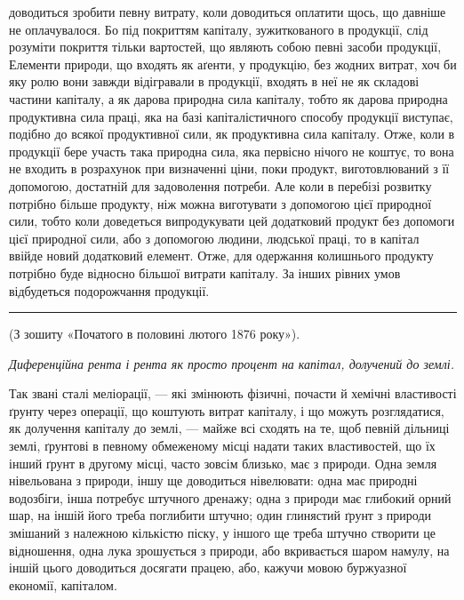 \parcont{}  %
доводиться зробити певну витрату, коли доводиться оплатити щось, що давніше
не оплачувалося. Бо під покриттям капіталу, зужиткованого в продукції, слід
розуміти покриття тільки вартостей, що являють собою певні засоби продукції,
Елементи природи, що входять як аґенти, у продукцію, без жодних витрат,
хоч би яку ролю вони завжди відігравали в продукції, входять в неї не як складові
частини капіталу, а як дарова природна сила капіталу, тобто як дарова природна
продуктивна сила праці, яка на базі капіталістичного способу продукції
виступає, подібно до всякої продуктивної сили, як продуктивна сила капіталу.
Отже, коли в продукції бере участь така природна сила, яка первісно
нічого не коштує, то вона не входить в розрахунок при визначенні ціни, поки
продукт, виготовлюваний з її допомогою, достатній для задоволення потреби.
Але коли в перебізі розвитку потрібно більше продукту, ніж можна виготувати
з допомогою цієї природної сили, тобто коли доведеться випродукувати
цей додатковий продукт без допомоги цієї природної сили, або з допомогою
людини, людської праці, то в капітал ввійде новий додатковий елемент. Отже,
для одержання колишнього продукту потрібно буде відносно більшої витрати
капіталу. За інших рівних умов відбудеться подорожчання продукції.

\pfbreak

(З зошиту «Початого в половині лютого 1876 року»).

\noindent{}\emph{Диференційна рента і рента як просто процент на капітал,
долучений до землі.}

\noindent{}Так звані сталі меліорації, — які змінюють фізичні, почасти й хемічні
властивості ґрунту через операції, що коштують витрат капіталу, і що можуть
розглядатися, як долучення капіталу до землі, — майже всі сходять на те,
щоб певній дільниці землі, ґрунтові в певному обмеженому місці надати таких
властивостей, що їх інший ґрунт в другому місці, часто зовсім близько, має
з природи. Одна земля нівельована з природи, іншу ще доводиться нівелювати:
одна має природні водозбіги, інша потребує штучного дренажу; одна з природи
має глибокий орний шар, на іншій його треба поглибити штучно; один глинястий
ґрунт з природи змішаний з належною кількістю піску, у іншого ще
треба штучно створити це відношення, одна лука зрошується з природи, або
вкривається шаром намулу, на іншій цього доводиться досягати працею, або,
кажучи мовою буржуазної економії, капіталом.

